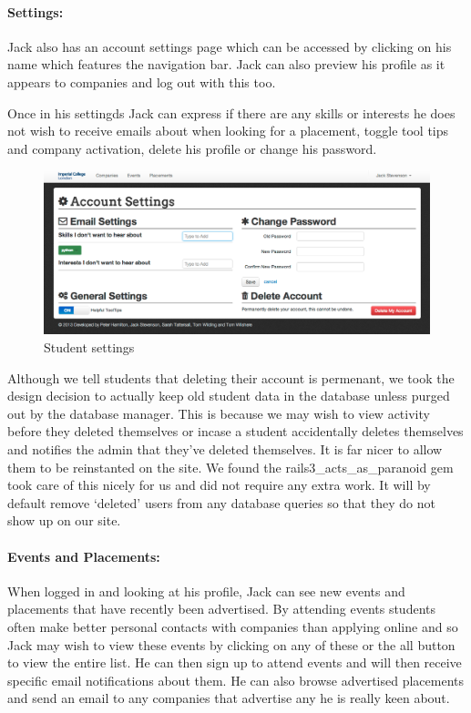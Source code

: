   \paragraph{Settings:}
    Jack also has an account settings page which can be accessed by clicking on his name which features the navigation bar. Jack can also preview his profile as it appears to companies and log out with this too. 

    Once in his settingds Jack can express if there are any skills or interests he does not wish to receive emails about when looking for a placement, toggle tool tips and company activation, delete his profile or change his password.

    \begin{figure}[H]\centering
    \includegraphics[scale=0.3]{images/user_experiences/student/account_settings}
    \caption{Student settings}
    \end{figure}

    Although we tell students that deleting their account is permenant, we took the design decision to actually keep old student data in the database unless purged out by the database manager. This is because we may wish to view activity before they deleted themselves or incase a student accidentally deletes themselves and notifies the admin that they've deleted themselves. It is far nicer to allow them to be reinstanted on the site. We found the rails3\_acts\_as\_paranoid\cite{paranoid_gem} gem took care of this nicely for us and did not require any extra work. It will by default remove `deleted' users from any database queries so that they do not show up on our site.

  \paragraph{Events and Placements:}
    When logged in and looking at his profile, Jack can see new events and placements that have recently been advertised. By attending events students often make better personal contacts with companies than applying online and so Jack may wish to view these events by clicking on any of these or the all button to view the entire list. He can then sign up to attend events and will then receive specific email notifications about them.
    He can also browse advertised placements and send an email to any companies that advertise any he is really keen about.

